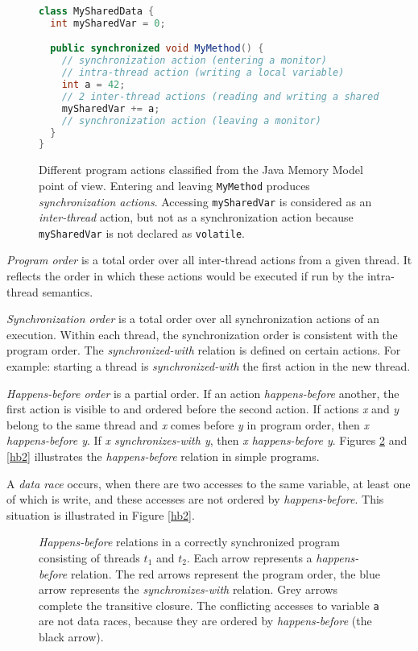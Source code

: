 \begin{figure}[hbt]
    \label{threadActions}
\begin{lstlisting}[language=java]
class MySharedData {
  int mySharedVar = 0;

  public synchronized void MyMethod() {
    // synchronization action (entering a monitor)
    // intra-thread action (writing a local variable)
    int a = 42;
    // 2 inter-thread actions (reading and writing a shared variable)
    mySharedVar += a;
    // synchronization action (leaving a monitor)
  }
}
\end{lstlisting}
    \caption{Different program actions classified from the Java Memory Model
    point of view. Entering and leaving \texttt{MyMethod} produces
    \emph{synchronization actions}. Accessing \texttt{mySharedVar} is considered
    as an \emph{inter-thread} action, but not as a synchronization action
    because \texttt{mySharedVar} is not declared as \texttt{volatile}.}
\end{figure}


\emph{Program order} is a total order over all inter-thread actions from a given
thread. It reflects the order in which these actions would be executed if
run by the intra-thread semantics.

\emph{Synchronization order} is a total order over all synchronization actions
of an execution. Within each thread, the synchronization order is consistent
with the program order. The \emph{synchronized-with} relation is defined on
certain actions. For example: starting a thread is \emph{synchronized-with}
the first action in the new thread.

\emph{Happens-before order} is a partial order. If an action
\emph{happens-before} another, the first action is visible to and ordered before
the second action. If actions \emph{x} and \emph{y} belong to the same thread
and \emph{x} comes before \emph{y} in program order, then \emph{x happens-before
y}.  If \emph{x synchronizes-with y}, then \emph{x happens-before y}. Figures
\ref{hb1} and \ref{hb2} illustrates the \emph{happens-before} relation in simple
programs.

A \emph{data race} occurs, when there are two accesses to the same variable, at
least one of which is write, and these accesses are not ordered by
\emph{happens-before}. This situation is illustrated in Figure \ref{hb2}.

\begin{figure}[hbt]
    \label{hb1}
    
    \caption{\emph{Happens-before} relations in a correctly synchronized program
    consisting of threads $t_1$ and $t_2$. Each arrow represents a
    \emph{happens-before} relation. The red arrows represent the program order,
    the blue arrow represents the \emph{synchronizes-with} relation. Grey arrows
    complete the transitive closure. The conflicting accesses to variable
    \texttt{a} are not data races, because they are ordered by
    \emph{happens-before} (the black arrow).}
\end{figure}

